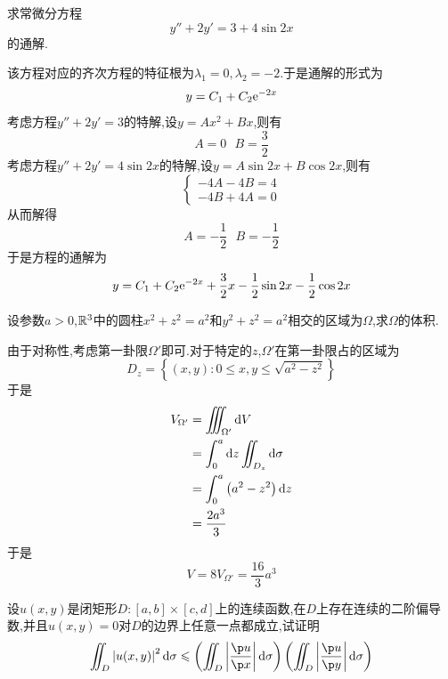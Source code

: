 \documentclass{ctexart}
\begin{document}
\begin{problem}[6.(10\songti{分})]
    求常微分方程
    \[y''+2y'=3+4\sin 2x\]
    的通解.
\end{problem}
\begin{solution}
    该方程对应的齐次方程的特征根为$\lambda_1=0,\lambda_2=-2$.于是通解的形式为
    \[y=C_1+C_2\mathrm{e}^{-2x}\]
    考虑方程$y''+2y'=3$的特解,设$y=Ax^2+Bx$,则有
    \[A=0\ \ \ B=\dfrac32\]
    考虑方程$y''+2y'=4\sin2x$的特解,设$y=A\sin2x+B\cos2x$,则有
    \[\left\{\begin{array}{l}
        -4A-4B=4\\
        -4B+4A=0
    \end{array}\right.\]
    从而解得
    \[A=-\dfrac12\ \ \ B=-\dfrac12\]
    于是方程的通解为
    \[y=C_1+C_2\mathrm{e}^{-2x}+\dfrac32x-\dfrac12\sin2x-\dfrac12\cos2x\]

\end{solution}
\begin{problem}[7.(10\songti{分})]
    设参数$a>0$,$\mathbb{R}^3$中的圆柱$x^2+z^2=a^2$和$y^2+z^2=a^2$相交的区域为$\Omega$,求$\Omega$的体积.
\end{problem}
\begin{solution}
    由于对称性,考虑第一卦限$\Omega'$即可.对于特定的$z$,$\Omega'$在第一卦限占的区域为
    \[D_z=\left\{(x,y):0\leqslant x,y\leqslant\sqrt{a^2-z^2}\right\}\]
    于是
    \[\begin{aligned}
        V_{\Omega'}
        &= \iiint_{\Omega'}\mathrm{d} V \\
        &= \int_0^a\mathrm{d} z\iint_{D_z}\mathrm{d}\sigma \\
        &= \int_0^a\left(a^2-z^2\right)\mathrm{d} z \\
        &= \dfrac{2a^3}{3}
    \end{aligned}\]
    于是
    \[V=8V_{\Omega'}=\dfrac{16}{3}a^3\]

\end{solution}
\begin{problem}[8.(10\songti{分})]
    设$u(x,y)$是闭矩形$D:[a,b]\times[c,d]$上的连续函数,在$D$上存在连续的二阶偏导数,并且$u(x,y)=0$对$D$的边界上任意一点都成立,试证明
    \[\iint_D\left|u(x,y)\right|^2\di\sigma\leqslant\left(\iint_D\left|\dfrac{\p u}{\p x}\right|\di\sigma\right)\left(\iint_D\left|\dfrac{\p u}{\p y}\right|\di\sigma\right)\]

\end{problem}
\end{document}
